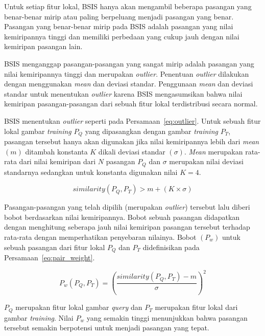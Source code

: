 Untuk setiap fitur lokal, BSIS hanya akan mengambil beberapa pasangan yang benar-benar mirip atau paling berpeluang menjadi pasangan yang benar. Pasangan yang benar-benar mirip pada BSIS adalah pasangan yang nilai kemiripannya tinggi dan memiliki perbedaan yang cukup jauh dengan nilai kemiripan pasangan lain. 

BSIS menganggap pasangan-pasangan yang sangat mirip adalah pasangan yang nilai kemiripannya tinggi dan merupakan \textit{outlier}. Penentuan \textit{outlier} dilakukan dengan menggunakan \textit{mean} dan deviasi standar. Penggunaan \textit{mean} dan deviasi standar untuk menentukan \textit{outlier} karena BSIS mengasumsikan bahwa nilai kemiripan pasangan-pasangan dari sebuah fitur lokal terdistribusi secara normal. 

BSIS menentukan \textit{outlier} seperti pada Persamaan~\ref{eq:outlier}. Untuk sebuah fitur lokal gambar \textit{training} $P_Q$ yang dipasangkan dengan gambar \textit{training} $P_T$, pasangan tersebut hanya akan digunakan jika nilai kemiripannya lebih dari \textit{mean} $(m)$ ditambah konstanta $K$ dikali deviasi standar $(\sigma)$. \textit{Mean} merupakan rata-rata dari nilai kemiripan dari $N$ pasangan $P_Q$ dan $\sigma$ merupakan nilai deviasi standarnya sedangkan untuk konstanta digunakan nilai $K=4$.

\vspace{-10px}
\begin{equation}
	\label{eq:outlier}
	similarity(P_Q, P_T) > m + (K \times \sigma)
\end{equation}

Pasangan-pasangan yang telah dipilih (merupakan \textit{outlier}) tersebut lalu diberi bobot berdasarkan nilai kemiripannya. Bobot sebuah pasangan didapatkan dengan menghitung seberapa jauh nilai kemiripan pasangan tersebut terhadap rata-rata dengan memperhatikan penyebaran nilainya. Bobot $(P_w)$ untuk sebuah pasangan dari fitur lokal $P_Q$ dan $P_T$ didefinisikan pada Persamaan~\ref{eq:pair_weight}.

\vspace{-7px}
\begin{equation}
	\label{eq:pair_weight}
	P_w(P_Q, P_T)=(\frac{similarity(P_Q, P_T) - m}{\sigma})^2
\end{equation}

$P_Q$ merupakan fitur lokal gambar \textit{query} dan $P_T$ merupakan fitur lokal dari gambar \textit{training}. Nilai $P_w$ yang semakin tinggi menunjukkan bahwa pasangan tersebut semakin berpotensi untuk menjadi pasangan yang tepat.

